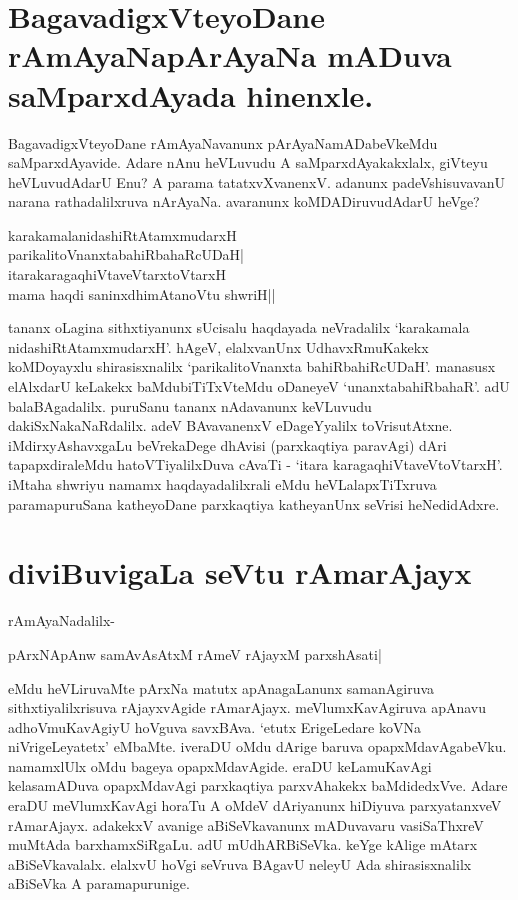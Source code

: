 \section*{BagavadigxVteyoDane rAmAyaNapArAyaNa mADuva saMparxdAyada hinenxle.}

BagavadigxVteyoDane rAmAyaNavanunx pArAyaNamADabeVkeMdu saMparxdAyavide. Adare nAnu heVLuvudu A saMparxdAyakakxlalx, giVteyu heVLuvudAdarU Enu? A parama tatatxvXvanenxV. adanunx padeVshisuvavanU narana rathadalilxruva nArAyaNa. avaranunx koMDADiruvudAdarU heVge?

\begin{shloka}
karakamalanidashiRtAtamxmudarxH\label{217}\\
parikalitoVnanxtabahiRbahaRcUDaH|\\
itarakaragaqhiVtaveVtarxtoVtarxH\\
mama haqdi saninxdhimAtanoVtu shwriH||
\end{shloka}

tananx oLagina sithxtiyanunx sUcisalu haqdayada neVradalilx `karakamala nidashiRtAtamxmudarxH'. hAgeV, elalxvanUnx UdhavxRmuKakekx koMDoyayxlu shirasisxnalilx `parikalitoVnanxta bahiRbahiRcUDaH'. manasusx elAlxdarU keLakekx baMdubiTiTxVteMdu oDaneyeV `unanxtabahiRbahaR'. adU balaBAgadalilx. puruSanu tananx nAdavanunx keVLuvudu dakiSxNakaNaRdalilx. adeV BAvavanenxV eDageYyalilx toVrisutAtxne. iMdirxyAshavxgaLu beVrekaDege dhAvisi (parxkaqtiya paravAgi) dAri tapapxdiraleMdu hatoVTiyalilxDuva cAvaTi - `itara karagaqhiVtaveVtoVtarxH'. iMtaha shwriyu namamx haqdayadalilxrali eMdu heVLalapxTiTxruva paramapuruSana katheyoDane parxkaqtiya katheyanUnx seVrisi heNedidAdxre.  

\section*{diviBuvigaLa seVtu rAmarAjayx}

rAmAyaNadalilx-

\begin{shloka}
pArxNApAnw samAvAsAtxM rAmeV rAjayxM parxshAsati|\label{218}
\end{shloka}
eMdu heVLiruvaMte pArxNa matutx apAnagaLanunx samanAgiruva sithxtiyalilxrisuva rAjayxvAgide rAmarAjayx. meVlumxKavAgiruva apAnavu adhoVmuKavAgiyU hoVguva savxBAva. `etutx ErigeLedare koVNa niVrigeLeyatetx' eMbaMte. iveraDU oMdu dArige baruva opapxMdavAgabeVku. namamxlUlx oMdu bageya opapxMdavAgide. eraDU keLamuKavAgi kelasamADuva opapxMdavAgi parxkaqtiya parxvAhakekx baMdidedxVve. Adare eraDU meVlumxKavAgi horaTu A oMdeV dAriyanunx hiDiyuva parxyatanxveV rAmarAjayx. adakekxV avanige aBiSeVkavanunx mADuvavaru vasiSaThxreV muMtAda barxhamxSiRgaLu. adU mUdhARBiSeVka. keYge kAlige mAtarx aBiSeVkavalalx. elalxvU hoVgi seVruva BAgavU neleyU Ada shirasisxnalilx aBiSeVka A paramapurunige.

